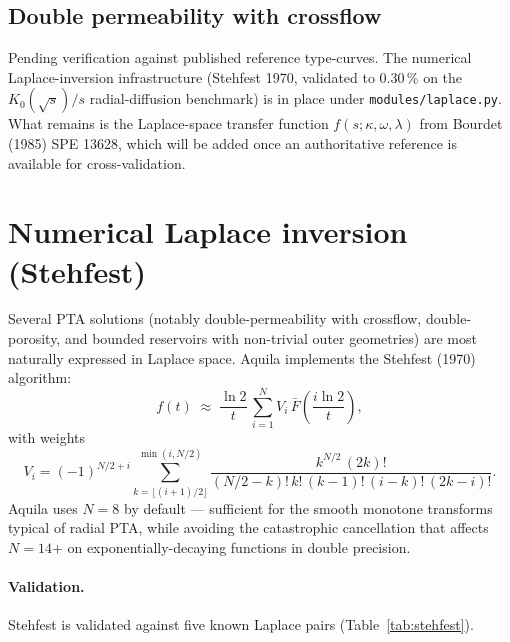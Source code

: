 \documentclass[11pt,a4paper]{article}
\begin{document}
\subsection{Double permeability with crossflow}

\textcolor{aqgrey}{Pending verification against published reference
type-curves. The numerical Laplace-inversion infrastructure (Stehfest
1970, validated to 0.30\,\% on the $K_0(\sqrt{s})/s$ radial-diffusion
benchmark) is in place under \texttt{modules/laplace.py}. What remains
is the Laplace-space transfer function $f(s;\kappa,\omega,\lambda)$ from
Bourdet (1985) SPE 13628, which will be added once an authoritative
reference is available for cross-validation.}

\section{Numerical Laplace inversion (Stehfest)}
\label{sec:stehfest}

Several PTA solutions (notably double-permeability with crossflow,
double-porosity, and bounded reservoirs with non-trivial outer
geometries) are most naturally expressed in Laplace space. Aquila
implements the Stehfest (1970) algorithm:
\begin{equation}
    f(t) \;\approx\;
    \frac{\ln 2}{t}\,\sum_{i=1}^{N} V_i\,\bar F\!\left(\frac{i\ln 2}{t}\right),
\end{equation}
with weights
\begin{equation}
    V_i = (-1)^{N/2+i} \!\!\!
    \sum_{k=\lfloor(i+1)/2\rfloor}^{\min(i,N/2)}
    \frac{k^{N/2}\,(2k)!}{(N/2-k)!\,k!\,(k-1)!\,(i-k)!\,(2k-i)!}.
\end{equation}
Aquila uses $N=8$ by default — sufficient for the smooth monotone
transforms typical of radial PTA, while avoiding the catastrophic
cancellation that affects $N=14$+ on exponentially-decaying functions
in double precision.

\paragraph{Validation.}
Stehfest is validated against five known Laplace pairs (Table~\ref{tab:stehfest}).
\end{document}
